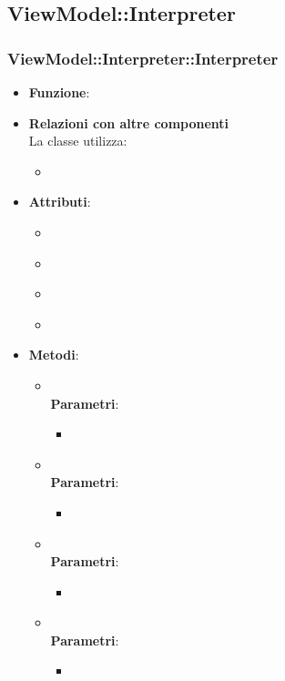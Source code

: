 \subsection{ViewModel::Interpreter}
\subsubsection{ViewModel::Interpreter::Interpreter}
\begin{itemize}
\item\textbf{Funzione}:
\item\textbf{Relazioni con altre componenti}\\
La classe utilizza:
	\begin{itemize}
		\item
	\end{itemize}
\item\textbf{Attributi}:
	\begin{itemize}
		\item\code{}\\
		\item\code{}\\
		\item\code{}\\
		\item\code{}\\
	\end{itemize}
\item\textbf{Metodi}:
	\begin{itemize}
		\item\code{}\\
		\textbf{Parametri}:
			\begin{itemize}
				\item\code{}\\
			\end{itemize}
		\item\code{}\\
		\textbf{Parametri}:
			\begin{itemize}
				\item\code{}\\
			\end{itemize}
		\item\code{}\\
		\textbf{Parametri}:
			\begin{itemize}
				\item\code{}\\
			\end{itemize}
		\item\code{}\\
		\textbf{Parametri}:
			\begin{itemize}
				\item\code{}\\
			\end{itemize}
	\end{itemize}
\end{itemize}


